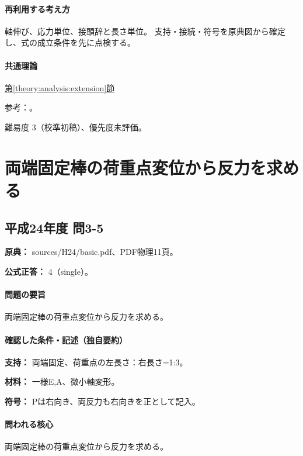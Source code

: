 \paragraph{再利用する考え方} 軸伸び、応力単位、接頭辞と長さ単位。 支持・接続・符号を原典図から確定し、式の成立条件を先に点検する。

\paragraph{共通理論} \hyperref[theory:analysis:extension]{第\ref*{theory:analysis:extension}節}

\par 参考：\cite{mit_material_elastic2000}。

\par 難易度 3（校準初稿）、優先度未評価。

\section{両端固定棒の荷重点変位から反力を求める}

\subsection{平成24年度 問3-5}
\label{q:h24-reg-basic-3-5}

\noindent\textbf{原典：} sources/H24/basic.pdf、PDF物理11頁。

\textbf{公式正答：} 4（single）。

\paragraph{問題の要旨} 両端固定棒の荷重点変位から反力を求める。

\paragraph{確認した条件・記述（独自要約）}\mbox{}\par

\noindent\textbf{支持：} 両端固定、荷重点の左長さ：右長さ=1:3。\par

\noindent\textbf{材料：} 一様E,A、微小軸変形。\par

\noindent\textbf{符号：} Pは右向き、両反力も右向きを正として記入。\par

\paragraph{問われる核心} 両端固定棒の荷重点変位から反力を求める。

